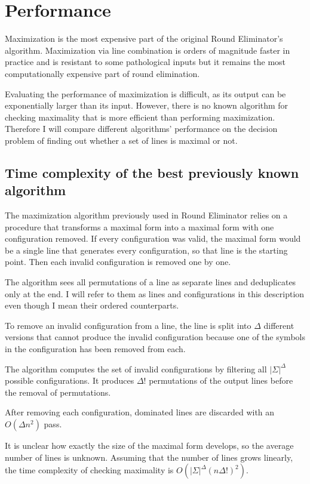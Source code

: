 \documentclass[english, 12pt, a4paper, sci, a-1b, online]{aaltothesis}
\begin{document}
\section{Performance}

Maximization is the most expensive part of the original Round Eliminator's algorithm. Maximization via line combination is orders of magnitude faster in practice and is resistant to some pathological inputs but it remains the most computationally expensive part of round elimination. %

Evaluating the performance of maximization is difficult, as its output can be exponentially larger than its input. However, there is no known algorithm for checking maximality that is more efficient than performing maximization. Therefore I will compare different algorithms' performance on the decision problem of finding out whether a set of lines is maximal or not.

\subsection{Time complexity of the best previously known algorithm}

The maximization algorithm previously used in Round Eliminator relies on a procedure that transforms a maximal form into a maximal form with one configuration removed. If every configuration was valid, the maximal form would be a single line that generates every configuration, so that line is the starting point. Then each invalid configuration is removed one by one.

The algorithm sees all permutations of a line as separate lines and deduplicates only at the end. I will refer to them as lines and configurations in this description even though I mean their ordered counterparts.

To remove an invalid configuration from a line, the line is split into $\Delta$ different versions that cannot produce the invalid configuration because one of the symbols in the configuration has been removed from each.

The algorithm computes the set of invalid configurations by filtering all $|\Sigma|^{\Delta}$ possible configurations. It produces $\Delta!$ permutations of the output lines before the removal of permutations.

After removing each configuration, dominated lines are discarded with an $O(\Delta n^2)$ pass.

It is unclear how exactly the size of the maximal form develops, so the average number of lines is unknown. Assuming that the number of lines grows linearly, the time complexity of checking maximality is $O(|\Sigma|^{\Delta}{(n\Delta!)}^2)$.
\end{document}
